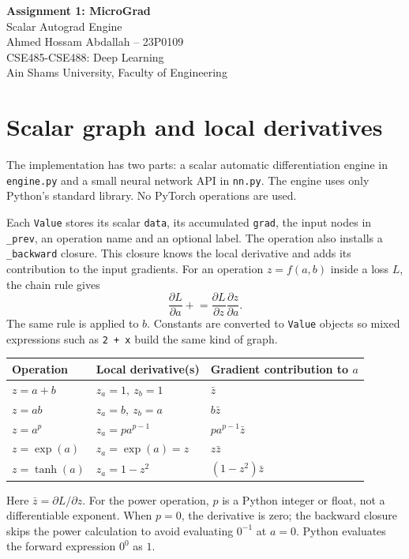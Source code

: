\documentclass[11pt,a4paper]{article}
\newcommand{\code}[1]{\texttt{#1}}
\begin{document}
\begin{center}
{\Large\bfseries Assignment 1: MicroGrad}\\[5pt]
{\large Scalar Autograd Engine}\\[8pt]
Ahmed Hossam Abdallah -- 23P0109\\
CSE485-CSE488: Deep Learning\\
Ain Shams University, Faculty of Engineering
\end{center}

\section{Scalar graph and local derivatives}
The implementation has two parts: a scalar automatic differentiation engine
in \code{engine.py} and a small neural network API in \code{nn.py}. The engine
uses only Python's standard library. No PyTorch operations are used.

Each \code{Value} stores its scalar \code{data}, its accumulated \code{grad},
the input nodes in \code{\_prev}, an operation name and an optional label.
The operation also installs a \code{\_backward} closure. This closure knows
the local derivative and adds its contribution to the input gradients.
For an operation $z=f(a,b)$ inside a loss $L$, the chain rule gives
\[
\frac{\partial L}{\partial a}\mathrel{+}=
\frac{\partial L}{\partial z}\frac{\partial z}{\partial a}.
\]
The same rule is applied to $b$. Constants are converted to \code{Value}
objects so mixed expressions such as \code{2 + x} build the same kind of graph.

\begin{center}
\begin{tabular}{lll}
\toprule
Operation & Local derivative(s) & Gradient contribution to $a$\\
\midrule
$z=a+b$ & $z_a=1,\ z_b=1$ & $\bar z$\\
$z=ab$ & $z_a=b,\ z_b=a$ & $b\bar z$\\
$z=a^p$ & $z_a=pa^{p-1}$ & $pa^{p-1}\bar z$\\
$z=\exp(a)$ & $z_a=\exp(a)=z$ & $z\bar z$\\
$z=\tanh(a)$ & $z_a=1-z^2$ & $(1-z^2)\bar z$\\
\bottomrule
\end{tabular}
\end{center}
Here $\bar z=\partial L/\partial z$. For the power operation, $p$ is a Python
integer or float, not a differentiable exponent. When $p=0$, the derivative
is zero; the backward closure skips the power calculation to avoid evaluating
$0^{-1}$ at $a=0$. Python evaluates the forward expression $0^0$ as $1$.
\end{document}
